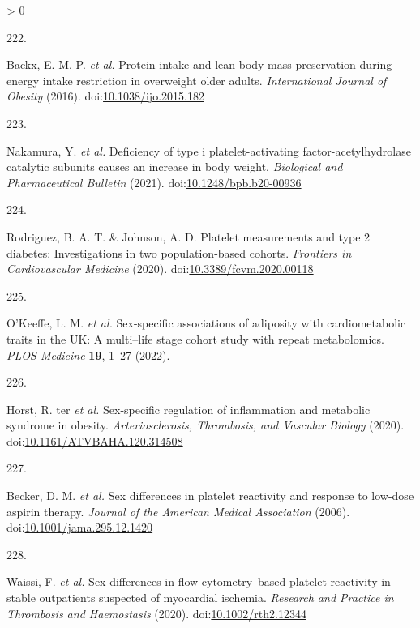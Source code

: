 \documentclass[11pt,twoside]{bristolthesis}
\newlength{\cslhangindent}
\newlength{\csllabelwidth}
\newenvironment{CSLReferences}[2] %
 {%
  \setlength{\parindent}{0pt}
  \ifodd #1 \everypar{\setlength{\hangindent}{\cslhangindent}}\ignorespaces\fi
  \ifnum #2 > 0
  \setlength{\parskip}{#2\baselineskip}
  \fi
 }%
 {}
\newcommand{\CSLLeftMargin}[1]{\parbox[t]{\csllabelwidth}{#1}}
\newcommand{\CSLRightInline}[1]{\parbox[t]{\linewidth - \csllabelwidth}{#1}\break}
\begin{document}
\begin{CSLReferences}{0}{0}
\leavevmode\hypertarget{ref-Backx2016}{}%
\CSLLeftMargin{222. }
\CSLRightInline{Backx, E. M. P. \emph{et al.} Protein intake and lean body mass preservation during energy intake restriction in overweight older adults. \emph{International Journal of Obesity} (2016). doi:\href{https://doi.org/10.1038/ijo.2015.182}{10.1038/ijo.2015.182}}

\leavevmode\hypertarget{ref-Nakamura2021}{}%
\CSLLeftMargin{223. }
\CSLRightInline{Nakamura, Y. \emph{et al.} Deficiency of type i platelet-activating factor-acetylhydrolase catalytic subunits causes an increase in body weight. \emph{Biological and Pharmaceutical Bulletin} (2021). doi:\href{https://doi.org/10.1248/bpb.b20-00936}{10.1248/bpb.b20-00936}}

\leavevmode\hypertarget{ref-Rodriguez2020}{}%
\CSLLeftMargin{224. }
\CSLRightInline{Rodriguez, B. A. T. \& Johnson, A. D. Platelet measurements and type 2 diabetes: Investigations in two population-based cohorts. \emph{Frontiers in Cardiovascular Medicine} (2020). doi:\href{https://doi.org/10.3389/fcvm.2020.00118}{10.3389/fcvm.2020.00118}}

\leavevmode\hypertarget{ref-OKeeffe2022}{}%
\CSLLeftMargin{225. }
\CSLRightInline{O'Keeffe, L. M. \emph{et al.} Sex-specific associations of adiposity with cardiometabolic traits in the UK: A multi--life stage cohort study with repeat metabolomics. \emph{PLOS Medicine} \textbf{19}, 1--27 (2022).}

\leavevmode\hypertarget{ref-TerHorst2020}{}%
\CSLLeftMargin{226. }
\CSLRightInline{Horst, R. ter \emph{et al.} Sex-specific regulation of inflammation and metabolic syndrome in obesity. \emph{Arteriosclerosis, Thrombosis, and Vascular Biology} (2020). doi:\href{https://doi.org/10.1161/ATVBAHA.120.314508}{10.1161/ATVBAHA.120.314508}}

\leavevmode\hypertarget{ref-Becker2006}{}%
\CSLLeftMargin{227. }
\CSLRightInline{Becker, D. M. \emph{et al.} Sex differences in platelet reactivity and response to low-dose aspirin therapy. \emph{Journal of the American Medical Association} (2006). doi:\href{https://doi.org/10.1001/jama.295.12.1420}{10.1001/jama.295.12.1420}}

\leavevmode\hypertarget{ref-Waissi2020}{}%
\CSLLeftMargin{228. }
\CSLRightInline{Waissi, F. \emph{et al.} Sex differences in flow cytometry--based platelet reactivity in stable outpatients suspected of myocardial ischemia. \emph{Research and Practice in Thrombosis and Haemostasis} (2020). doi:\href{https://doi.org/10.1002/rth2.12344}{10.1002/rth2.12344}}


\end{CSLReferences}
\end{document}

